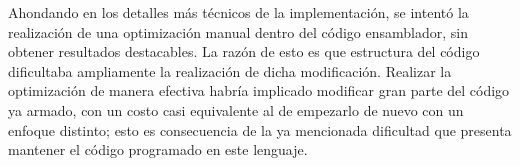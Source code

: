 \documentclass[a4paper]{article}
\begin{document}
    Ahondando en los detalles más técnicos de la implementación, se intentó la realización de una optimización manual dentro del código ensamblador, sin obtener resultados destacables. La razón de esto es que estructura del código dificultaba ampliamente la realización de dicha modificación. Realizar la optimización de manera efectiva habría implicado modificar gran parte del código ya armado, con un costo casi equivalente al de empezarlo de nuevo con un enfoque distinto; esto es consecuencia de la ya mencionada dificultad que presenta mantener el código programado en este lenguaje.
\end{document}
